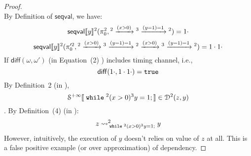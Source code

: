 \begin{example}
\begin{proof}
\[\]
%
By Definition of $\mathsf{seqval}$, we have:
\[
	\mathsf{seqval}\llbracket y \rrbracket{}^2(\pi_0^2, {}^2 \xrightarrow{(x > 0)} {}^3 \xrightarrow{(y = 1) = 1} {}^2 ) = 1 \cdot
\]
%
\[
	\mathsf{seqval}\llbracket y \rrbracket{}^2(\pi_0'^2, {}^2 \xrightarrow{(x > 0)} {}^3 \xrightarrow{(y = 1) = 1} {}^2 \xrightarrow{(x > 0)} {}^3 \xrightarrow{(y = 1) = 1}{}^2 ) = 1 \cdot 1 \cdot
\]
%
If $\mathsf{diff}(\omega, \omega')$ (in \cite{cousot2019abstract} Equation~(2) ) includes timing channel, i.e., 
%
\[
	\mathsf{diff}(1 \cdot, 1 \cdot 1 \cdot) = \mathtt{true}
\]
%
By Definition~2 (in \cite{cousot2019abstract}), 
\[
	\mathcal{S}^{+\infty}\llbracket \;\mathtt{while}\; {}^2 (x > 0) {}^3 y = 1; \rrbracket 
\in \mathcal{D}^2(z, y)
\].
%
By Definition~(4) (in \cite{cousot2019abstract}):
\[
	z \rightsquigarrow^{2}_{\;\mathtt{while}\; {}^2 (x > 0) {}^3 y = 1;} y
\]
%
However, intuitively, the execution of $y$ doesn't relies on value of $z$ at all. This is a false positive example (or over approximation) of dependency.
%
\end{proof}
\end{example}
%
\clearpage
